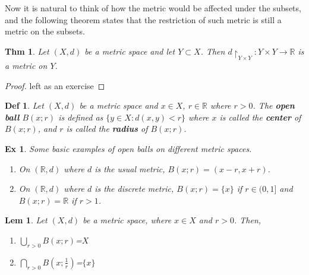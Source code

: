 \documentclass[paper=a4, fontsize=11pt]{scrartcl}
\newcommand{\ball}[2]{$B({#1};{#2})$}
\newtheorem{theorem}{Thm}
\newtheorem{definition}{Def}
\newtheorem{example}{Ex}
\newtheorem{lemma}{Lem}
\begin{document}
Now it is natural to think of how the metric would be affected under the subsets, and the following theorem states that the restriction of such metric is still a metric on the subsets. \\
\begin{theorem}
	Let $(X,d)$ be a metric space and let $Y\subset X$. Then $d\restriction_{Y\times Y} : Y \times Y \to \mathbb{R}$ is a metric on $Y$.
\end{theorem}
\begin{proof}
	left as an exercise
\end{proof}
\vspace{2.5ex}
\begin{definition}
	Let $(X,d)$ be a metric space and $x\in X$, $r \in \mathbb{R}$ where $r>0$. The \textbf{open ball} \ball{x}{r} is defined as $\{y\in X : d(x,y)<r\}$ where $x$ is called the \textbf{center} of \ball{x}{r}, and $r$ is called the \textbf{radius} of \ball{x}{r}.\\
\end{definition}

\begin{example}
	Some basic examples of open balls on different metric spaces.
	\begin{enumerate}[label=\arabic*)]
		\item On $(\mathbb{R},d)$ where $d$ is the usual metric, \ball{x}{r}$=(x-r,x+r)$.
		\item On $(\mathbb{R},d)$ where $d$ is the discrete metric, \ball{x}{r}$=\{x\}$  if $r\in(0,1]$ and  \ball{x}{r}$=\mathbb{R}$  if $r>1$.\\
	\end{enumerate}
\end{example}

\begin{lemma}
	Let $(X,d)$ be a metric space, where $x\in X$ and $r>0$. Then,
	\begin{enumerate}
		\item $\bigcup\limits_{r>0}$\ball{x}{r}=$X$
		\item $\bigcap\limits_{r>0}$\ball{x}{\frac{1}{r}}=$\{x\}$ \\
	\end{enumerate}
\end{lemma}
\end{document}
